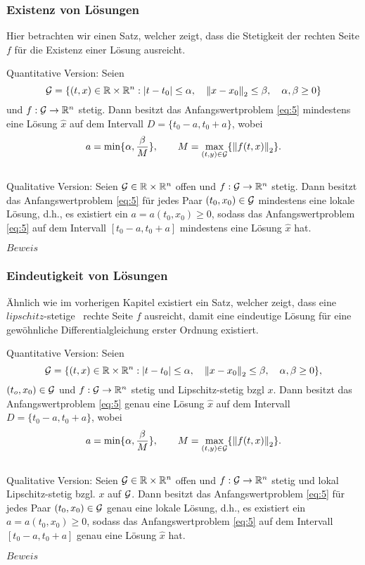 \subsubsection{Existenz von Lösungen}
Hier betrachten wir einen Satz, welcher zeigt, dass die Stetigkeit der rechten Seite $f$ für die Existenz einer
Lösung ausreicht.
\begin{satz}
Quantitative Version: Seien
\[
        {\cal G}=\{(t,x) \in \mathbb{R} \times \mathbb{R}^{n}: |t-t_{0}| \leq \alpha, \quad
    \left\lVert x-x_{0} \right\rVert _{2} \leq\beta, \quad \alpha,\beta \geq 0 \}
\]
und $f:{\cal G} \rightarrow \mathbb{R}^{n}$ stetig. Dann besitzt das Anfangswertproblem \eqref{eq:5}
mindestens eine Lösung $\hat{x}$ auf dem Intervall $D=\{t_{0}-a,t_{0}+a\}$, wobei
\[
    a=\min\{\alpha, \frac{\beta}{M}\}, \qquad M= \max_{(t,y)\in {\cal G}}\{\left\lVert f(t,x)\right\rVert_{2} \}
    .
\]\\
Qualitative Version: Seien ${\cal G}\in \mathbb{R} \times \mathbb{R}^{n}$ offen und $f:{\cal G} \rightarrow \mathbb{R}^{n}$ stetig.
Dann besitzt das Anfangswertproblem \eqref{eq:5} für jedes Paar $(t_{0},x_{0}) \in {\cal G}$ mindestens eine
lokale Lösung, d.h., es existiert ein $a=a(t_{0},x_{0}) \geq 0$, sodass das Anfangswertproblem \eqref{eq:5} auf
dem Intervall $[t_{0}-a,t_{0}+a]$ mindestens eine Lösung $\hat{x}$ hat.
\end{satz}
$Beweis$ \cite[52-55]{beckGewohnlicheDifferentialgleichungen2018}

\subsubsection{Eindeutigkeit von Lösungen}
Ähnlich wie im vorherigen Kapitel existiert ein Satz, welcher zeigt, dass eine $lipschitz$-stetige~\cite{LipschitzStetigkeitSerloMathe}
rechte Seite $f$ ausreicht, damit eine eindeutige Lösung für eine
gewöhnliche Differentialgleichung erster Ordnung existiert.
\begin{satz}
Quantitative Version: Seien
\[
        {\cal G}=\{(t,x) \in \mathbb{R} \times \mathbb{R}^{n}: |t-t_{0}| \leq \alpha, \quad
    \left\lVert x-x_{0} \right\rVert _{2} \leq\beta, \quad \alpha,\beta \geq 0 \},
\]
$(t_{o},x_{0})\in {\cal G}$ und $f:{\cal G} \rightarrow \mathbb{R}^{n}$ stetig und Lipschitz-stetig bzgl $x$.
Dann besitzt das Anfangswertproblem \eqref{eq:5} genau eine Lösung $\hat{x}$ auf dem Intervall
$D=\{t_{0}-a,t_{0}+a\}$, wobei
\[
    a=\min\{\alpha, \frac{\beta}{M}\}, \qquad M= \max_{(t,y)\in {\cal G}}\{\left\lVert f(t,x)\right\rVert_{2} \}
    .
\]\\
Qualitative Version: Seien ${\cal G}\in \mathbb{R} \times \mathbb{R}^{n}$ offen und $f:{\cal G} \rightarrow \mathbb{R}^{n}$ stetig und lokal
Lipschitz-stetig bzgl. $x$ auf $\cal{G}$. Dann besitzt das Anfangswertproblem \eqref{eq:5} für jedes Paar
$(t_{0},x_{0}) \in {\cal G}$ genau eine lokale Lösung, d.h., es existiert ein $a=a(t_{0},x_{0}) \geq 0$, sodass
das Anfangswertproblem \eqref{eq:5} auf dem Intervall $[t_{0}-a,t_{0}+a]$ genau eine Lösung $\hat{x}$ hat.
\end{satz}
$Beweis$ \cite[56-58]{beckGewohnlicheDifferentialgleichungen2018}

